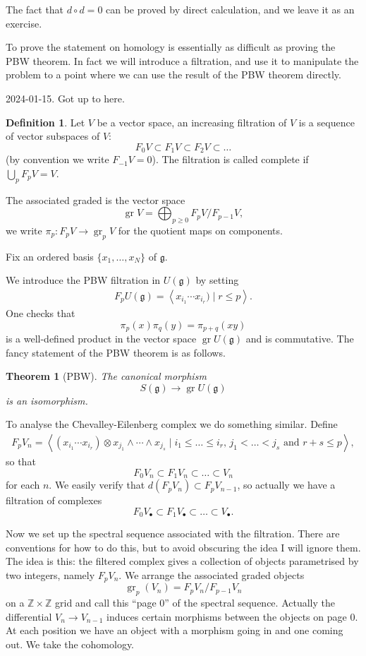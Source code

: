 \documentclass[12pt]{article}
\theoremstyle{plain}
\newtheorem{thm}{Theorem}[section]
\theoremstyle{definition}
\newtheorem{defn}{Definition}[section]
\numberwithin{equation}{section}
\DeclareMathOperator{\gr}{gr}
\newcommand{\Z}{\mathbb{Z}}
\newcommand{\g}{\mathfrak{g}}
\begin{document}
The fact that $d \circ d = 0$ can be proved by direct calculation, and we leave it as an exercise.

To prove the statement on homology is essentially as difficult as proving the PBW theorem. In fact we will introduce a filtration, and use it to manipulate the problem to a point where we can use the result of the PBW theorem directly.

{\color{red}2024-01-15. Got up to here.}


\begin{defn}
Let $V$ be a vector space, an increasing filtration of $V$ is a sequence of vector subspaces of $V$:
\[
F_0V \subset F_1V \subset F_2V \subset \ldots
\]
(by convention we write $F_{-1}V = 0$). The filtration is called complete if $\bigcup_p F_pV = V$.

The associated graded is the vector space
\[
\gr V = \bigoplus_{p \geq 0} F_pV / F_{p-1}V,
\]
we write $\pi_p : F_pV \rightarrow \gr_p V$ for the quotient maps on components.
\end{defn}

Fix an ordered basis $\{x_1, \ldots, x_N\}$ of $\g$.

We introduce the PBW filtration in $U(\g)$ by setting
\begin{align*}
F_p U(\g) = \left< x_{i_1} \cdots x_{i_r}) \mid r \leq p \right>.
\end{align*}
One checks that
\[
\pi_p(x) \pi_q(y) = \pi_{p+q}(xy)
\]
is a well-defined product in the vector space $\gr U(\g)$ and is commutative. The fancy statement of the PBW theorem is as follows.
\begin{thm}[PBW]
The canonical morphism
\[
S(\g) \rightarrow \gr U(\g)
\]
is an isomorphism.
\end{thm}


To analyse the Chevalley-Eilenberg complex we do something similar. Define
\begin{align*}
F_p V_n = \left< (x_{i_1} \cdots x_{i_r}) \otimes x_{j_1} \wedge \cdots \wedge x_{j_s} \mid \text{$i_1 \leq \ldots \leq i_r$, $j_1 < \ldots < j_s$ and $r + s \leq p$} \right>,
\end{align*}
so that
\[
F_0V_n \subset F_1V_n \subset \ldots \subset V_n
\]
for each $n$. We easily verify that $d(F_pV_n) \subset F_pV_{n-1}$, so actually we have a filtration of complexes
\[
F_0V_\bullet \subset F_1V_\bullet \subset \ldots \subset V_\bullet.
\]

Now we set up the spectral sequence associated with the filtration. There are conventions for how to do this, but to avoid obscuring the idea I will ignore them. The idea is this: the filtered complex gives a collection of objects parametrised by two integers, namely $F_pV_n$. We arrange the associated graded objects
\[
 \gr_p(V_n) = F_pV_n / F_{p-1}V_n
\]
on a $\Z \times \Z$ grid and call this ``page $0$'' of the spectral sequence. Actually the differential $V_n \rightarrow V_{n-1}$ induces certain morphisms between the objects on page $0$. At each position we have an object with a morphism going in and one coming out. We take the cohomology.
\end{document}
